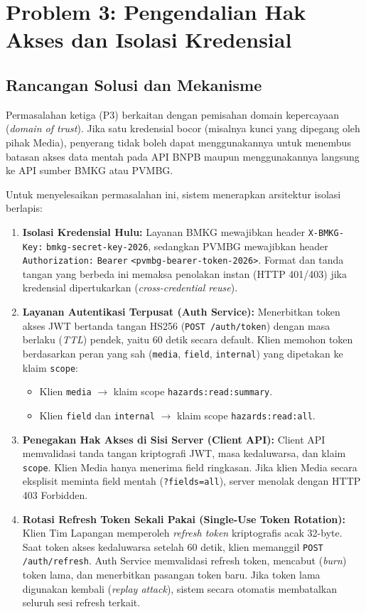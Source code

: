 \clearpage
\section{Problem 3: Pengendalian Hak Akses dan Isolasi Kredensial}

\subsection{Rancangan Solusi dan Mekanisme}
Permasalahan ketiga (P3) berkaitan dengan pemisahan domain kepercayaan (\textit{domain of trust}). Jika satu kredensial bocor (misalnya kunci yang dipegang oleh pihak Media), penyerang tidak boleh dapat menggunakannya untuk menembus batasan akses data mentah pada API BNPB maupun menggunakannya langsung ke API sumber BMKG atau PVMBG.

Untuk menyelesaikan permasalahan ini, sistem menerapkan arsitektur isolasi berlapis:
\begin{enumerate}
    \item \textbf{Isolasi Kredensial Hulu:} Layanan BMKG mewajibkan header \texttt{X-BMKG-Key:} \texttt{bmkg-}\allowbreak\texttt{secret-}\allowbreak\texttt{key-}\allowbreak\texttt{2026}, sedangkan PVMBG mewajibkan header \texttt{Authorization:} \texttt{Bearer} \texttt{<pvmbg-}\allowbreak\texttt{bearer-}\allowbreak\texttt{token-}\allowbreak\texttt{2026>}. Format dan tanda tangan yang berbeda ini memaksa penolakan instan (HTTP 401/403) jika kredensial dipertukarkan (\textit{cross-credential reuse}).
    \item \textbf{Layanan Autentikasi Terpusat (Auth Service):} Menerbitkan token akses JWT bertanda tangan HS256 (\texttt{POST /auth/token}) dengan masa berlaku (\textit{TTL}) pendek, yaitu 60 detik secara default. Klien memohon token berdasarkan peran yang sah (\texttt{media}, \texttt{field}, \texttt{internal}) yang dipetakan ke klaim \texttt{scope}:
    \begin{itemize}
        \item Klien \texttt{media} $\rightarrow$ klaim scope \texttt{hazards:read:summary}.
        \item Klien \texttt{field} dan \texttt{internal} $\rightarrow$ klaim scope \texttt{hazards:read:all}.
    \end{itemize}
    \item \textbf{Penegakan Hak Akses di Sisi Server (Client API):} Client API memvalidasi tanda tangan kriptografi JWT, masa kedaluwarsa, dan klaim \texttt{scope}. Klien Media hanya menerima field ringkasan. Jika klien Media secara eksplisit meminta field mentah (\texttt{?fields=all}), server menolak dengan HTTP 403 Forbidden.
    \item \textbf{Rotasi Refresh Token Sekali Pakai (Single-Use Token Rotation):} Klien Tim Lapangan memperoleh \textit{refresh token} kriptografis acak 32-byte. Saat token akses kedaluwarsa setelah 60 detik, klien memanggil \mbox{\texttt{POST /auth/refresh}}. Auth Service memvalidasi refresh token, mencabut (\textit{burn}) token lama, dan menerbitkan pasangan token baru. Jika token lama digunakan kembali (\textit{replay attack}), sistem secara otomatis membatalkan seluruh sesi refresh terkait.
\end{enumerate}

